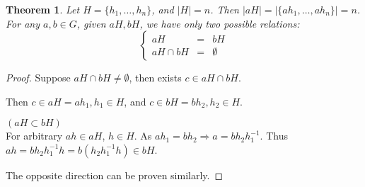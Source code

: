 \documentclass{article}
\theoremstyle{MyNonumberplain}
\theoremstyle{break}
\newtheorem*{proof}{Proof. }
\theoremstyle{break}
\newtheorem{theorem}{Theorem}[section]
\theoremstyle{break}
\theoremstyle{definition}
\theoremstyle{break}
\begin{document}
\begin{thmbox}
    \begin{theorem}
        Let $H = \{ h_1, \ldots, h_n \}$, and $| H | = n$. Then $| a H | = | \{ a h_1,
        \ldots, a h_n \} | = n$. For any $a, b \in G$, given $a H, b H$, we have only two possible relations:
        $$\left\{\begin{array}{lll}
        a H & = & b H\\
        a H \cap b H & = & \emptyset
        \end{array}\right.$$
    \end{theorem}
    \begin{prfbox}
        \begin{proof}
            Suppose $a H \cap b H \neq \emptyset$, then exists $c \in a H \cap b H$.\bigskip

            Then $c \in a H = a h_1, h_1 \in H$, and $c \in b H = b h_2, h_2 \in H$.\bigskip
            
            $(a H \subset b H)$\\
            
            For arbitrary $a h \in a H$, $h \in H$. As $a h_1 = b h_2 \Rightarrow a = b
            h_2 h^{- 1}_1$. Thus $a h = b h_2 h^{- 1}_1 h = b (h_2 h^{- 1}_1 h) \in b H$.\bigskip
            
            The opposite direction can be proven similarly. 
        \end{proof}
    \end{prfbox}
\end{thmbox}
\end{document}
